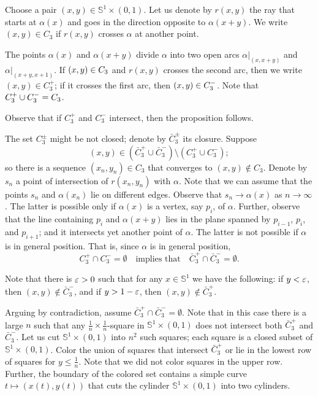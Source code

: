 Choose a pair $(x,y)\in \mathbb{S}^1\times (0,1)$.
Let us denote by $r(x,y)$ the ray that starts at $\alpha(x)$ and goes in the direction opposite to $\alpha(x+y)$.
We write $(x,y)\in C_3$ if $r(x,y)$ crosses $\alpha$ at another point.

The points $\alpha(x)$ and $\alpha(x+y)$ divide $\alpha$ into two open arcs $\alpha|_{(x,x+y)}$ and $\alpha|_{(x+y,x+1)}$.
If $(x,y)\z\in C_3$ and $r(x,y)$ crosses the second arc, then we write $(x,y)\in C_3^+$;
if it crosses the first arc, then $(x,y)\z\in C_3^-$.
Note that $C_3^+\cup C_3^-\z=C_3$.

Observe that if $C_3^+$ and $C_3^-$ intersect, then the proposition follows.

The set $C_3^\pm$ might be not closed;
denote by $\bar C_3^\pm$ its closure.
Suppose 
\[(x,y)\in (\bar C_3^+\cup\bar C_3^-)\setminus(C_3^+\cup C_3^-);\]
so there is a sequence $(x_n,y_n)\in C_3$ that converges to $(x,y)\notin C_3$.
Denote by $s_n$ a point of intersection of $r(x_n,y_n)$ with $\alpha$.
Note that we can assume that the points $s_n$ and $\alpha(x_n)$ lie on different edges.
Observe that $s_n\to \alpha(x)$ as $n\to\infty$.
The latter is possible only if $\alpha(x)$ is a vertex, say $p_i$, of $\alpha$.
Further, observe that the line containing $p_i$ and $\alpha(x+y)$ lies in the plane spanned by $p_{i-1}$, $p_i$, and $p_{i+1}$; and it intersects yet another point of $\alpha$.
The latter is not possible if $\alpha$ is in general position.
That is, since $\alpha$ is in general position, 
\[C_3^+\cap C_3^-=\emptyset\quad\text{implies that}\quad
\bar C_3^+\cap \bar C_3^-=\emptyset.\]

Note that there is $\varepsilon>0$ such that for any $x\in\mathbb{S}^1$ we have the following:
if $y<\varepsilon$, then $(x,y)\notin \bar C_3^-$,
and if $y>1-\varepsilon$, then $(x,y)\notin \bar C_3^+$.

Arguing by contradiction, assume $\bar C_3^+\cap \bar C_3^-=\emptyset$.
Note that in this case there is a large $n$ such that any $\tfrac1n\times\tfrac1n$-square in $\mathbb{S}^1\times (0,1)$ does not intersect both $\bar C_3^+$ and $\bar C_3^-$.
Let us cut $\mathbb{S}^1\times (0,1)$ into $n^2$ such squares; each square is a closed subset of $\mathbb{S}^1\times (0,1)$.
Color the union of squares that intersect $\bar C_3^+$ or lie in the lowest row of squares for $y\le \tfrac1n$.
Note that we did not color squares in the upper row.
Further, the boundary of the colored set contains a simple curve $t\mapsto(x(t),y(t))$ that cuts  the cylinder $\mathbb{S}^1\times (0,1)$ into two cylinders.

